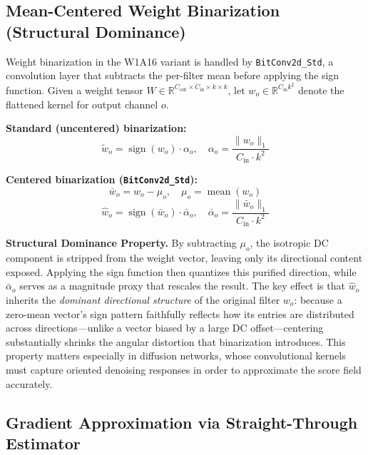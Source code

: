 \documentclass[conference]{IEEEtran}
\begin{document}
\subsection{Mean-Centered Weight Binarization (Structural Dominance)}

Weight binarization in the W1A16 variant is handled by \texttt{BitConv2d\_Std}, a
convolution layer that subtracts the per-filter mean before applying the sign function.
Given a weight tensor $W \in \mathbb{R}^{C_\text{out} \times C_\text{in} \times k
\times k}$, let $w_o \in \mathbb{R}^{C_\text{in}k^2}$ denote the flattened kernel for
output channel $o$.

\textbf{Standard (uncentered) binarization:}
\begin{equation}
  \tilde{w}_o = \operatorname{sign}(w_o)\cdot\alpha_o,
  \quad
  \alpha_o = \frac{\|w_o\|_1}{C_\text{in}\cdot k^2}
  \label{eq:std-bin}
\end{equation}

\textbf{Centered binarization (\texttt{BitConv2d\_Std}):}
\begin{equation}
  \bar{w}_o = w_o - \mu_o,
  \quad
  \mu_o = \operatorname{mean}(w_o)
  \label{eq:center}
\end{equation}
\begin{equation}
  \hat{w}_o = \operatorname{sign}(\bar{w}_o)\cdot\bar\alpha_o,
  \quad
  \bar\alpha_o = \frac{\|\bar{w}_o\|_1}{C_\text{in}\cdot k^2}
  \label{eq:cen-bin}
\end{equation}

\textbf{Structural Dominance Property.} By subtracting $\mu_o$, the isotropic DC
component is stripped from the weight vector, leaving only its directional content
exposed. Applying the sign function then quantizes this purified direction, while
$\bar\alpha_o$ serves as a magnitude proxy that rescales the result. The key effect is
that $\hat{w}_o$ inherits the \emph{dominant directional structure} of the original
filter $w_o$: because a zero-mean vector's sign pattern faithfully reflects how its
entries are distributed across directions---unlike a vector biased by a large DC
offset---centering substantially shrinks the angular distortion that binarization
introduces. This property matters especially in diffusion networks, whose convolutional
kernels must capture oriented denoising responses in order to approximate the score
field accurately.

\subsection{Gradient Approximation via Straight-Through Estimator}
\end{document}
